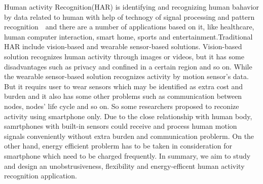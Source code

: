 \begin{enabstract}
\par  Human activity Recognition(HAR) is identifying and recognizing human bahavior by data related to human with help of technogy of signal processing and pattern recognition　and there are a number of applications based on it, like healthcare, 
human computer interaction, smart home, sports and entertainment.Traditional HAR include vision-based and wearable sensor-based solutions. Vision-based solution recognizes human activity through images or videos, but it has some disadvantages such as privacy and confined in a certain region and so on. While the wearable sensor-based solution recognizes activity by motion sensor's data. But it requirs user to wear sensors which may be identified as extra cost and burden and it also has some other problems such as communication between nodes, nodes' life cycle and so on. So some researchers proposed to reconize activity using smartphone only. Due to the close relationship with human body, samrtphones with built-in sensors could receive and process human motion signals conveniently without extra burden and communication problerm. On the other hand, energy efficient problerm has to be taken in consideration for smartphone which need to be charged frequently. In summary, we aim to study and design an unobstrusiveness, flexibility and energy-efficent human activity recognition application.
\begin{enumerate}[(1)]
	

\end{enumerate}
\end{enabstract}
